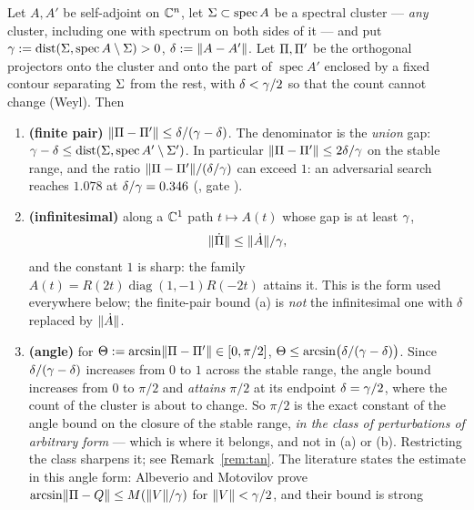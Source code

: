 \begin{theorem}\label{thm:riesz}
Let $A,A'$ be self-adjoint on $\mathbb{C}^n$, let $\Sigma\subset\operatorname{spec}A$ be a spectral
cluster --- \emph{any} cluster, including one with spectrum on both sides of it --- and put
$\gamma:=\operatorname{dist}(\Sigma,\operatorname{spec}A\setminus\Sigma)>0$,
$\delta:=\lVert A-A'\rVert$. Let $\Pi,\Pi'$ be the orthogonal projectors onto the cluster and onto the
part of $\operatorname{spec}A'$ enclosed by a fixed contour separating $\Sigma$ from the rest,
with $\delta<\gamma/2$ so that the count cannot change (Weyl). Then
\begin{enumerate}[label=(\alph*)]
\item \textbf{(finite pair)} $\lVert\Pi-\Pi'\rVert\le\delta/(\gamma-\delta)$\label{eq:prb}. The
denominator is the \emph{union} gap: $\gamma-\delta\le\operatorname{dist}(\Sigma,
\operatorname{spec}A'\setminus\Sigma')$. In particular $\lVert\Pi-\Pi'\rVert\le2\delta/\gamma$ on the
stable range, and the ratio $\lVert\Pi-\Pi'\rVert/(\delta/\gamma)$ can exceed $1$: an adversarial search
reaches $1.078$ at $\delta/\gamma=0.346$ (\V, gate ).
\item \textbf{(infinitesimal)} along a $\mathbb{C}^1$ path $t\mapsto A(t)$ whose gap is at least $\gamma$,
\begin{equation}\label{eq:deriv}
   \lVert\dot{\Pi}\rVert\le\lVert\dot A\rVert/\gamma ,
\end{equation}
and the constant $1$ is sharp: the family $A(t)=R(2t)\operatorname{diag}(1,-1)R(-2t)$ attains
it. This is the form used everywhere below; the finite-pair bound (a) is \emph{not} the
infinitesimal one with $\delta$ replaced by $\lVert\dot A\rVert$.
\item \textbf{(angle)} for $\Theta:=\arcsin\lVert\Pi-\Pi'\rVert\in[0,\pi/2]$,
$\Theta\le\arcsin\bigl(\delta/(\gamma-\delta)\bigr)$. Since $\delta/(\gamma-\delta)$ increases from
$0$ to $1$ across the stable range, the angle bound increases from $0$ to $\pi/2$ and
\emph{attains} $\pi/2$ at its endpoint $\delta=\gamma/2$, where the count of the cluster is about
to change. So $\pi/2$ is the exact constant of the angle bound on the closure of the stable
range, \emph{in the class of perturbations of arbitrary form} --- which is where it belongs, and
not in (a) or (b). Restricting the class sharpens it; see Remark~\ref{rem:tan}. The literature
states the estimate in this angle form: Albeverio and Motovilov \Cc{} prove
$\arcsin\lVert\Pi-Q\rVert\le M(\lVert V\rVert/\gamma)$ for $\lVert V\rVert<\gamma/2$, and their bound is strong

\end{enumerate}
\end{theorem}

